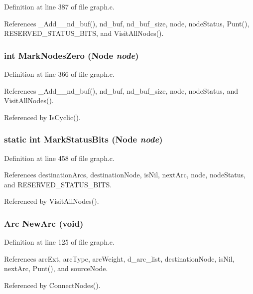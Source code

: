 Definition at line 387 of file graph.c.

References \_\-Add\_\_\-nd\_\-buf(), nd\_\-buf, nd\_\-buf\_\-size, node, node\-Status, Punt(), RESERVED\_\-STATUS\_\-BITS, and Visit\-All\-Nodes().
\subsubsection{\setlength{\rightskip}{0pt plus 5cm}int Mark\-Nodes\-Zero (\bf{Node} {\em node})}\label{graph_8c_ddaa36b43cfefe9f2f46d221162e2118}




Definition at line 366 of file graph.c.

References \_\-Add\_\_\-nd\_\-buf(), nd\_\-buf, nd\_\-buf\_\-size, node, node\-Status, and Visit\-All\-Nodes().

Referenced by Is\-Cyclic().
\subsubsection{\setlength{\rightskip}{0pt plus 5cm}static int Mark\-Status\-Bits (\bf{Node} {\em node})\hspace{0.3cm}{\tt  [static]}}\label{graph_8c_b13887fc94bf89923a39d46247f16001}




Definition at line 458 of file graph.c.

References destination\-Arcs, destination\-Node, is\-Nil, next\-Arc, node, node\-Status, and RESERVED\_\-STATUS\_\-BITS.

Referenced by Visit\-All\-Nodes().
\subsubsection{\setlength{\rightskip}{0pt plus 5cm}\bf{Arc} New\-Arc (void)}\label{graph_8c_9ec8b541a689c1c76d2b64fde7489e2f}




Definition at line 125 of file graph.c.

References arc\-Ext, arc\-Type, arc\-Weight, d\_\-arc\_\-list, destination\-Node, is\-Nil, next\-Arc, Punt(), and source\-Node.

Referenced by Connect\-Nodes().
